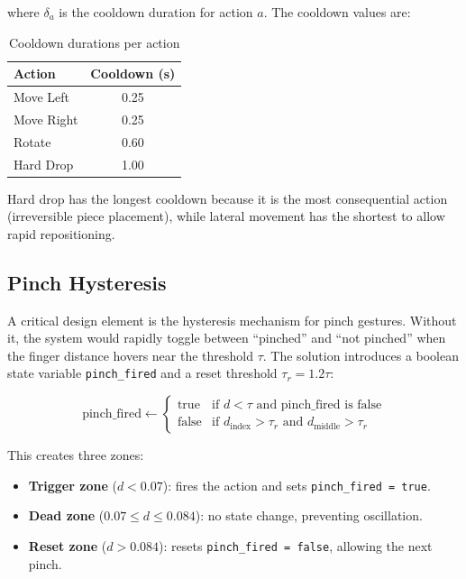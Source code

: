 \documentclass[conference]{IEEEtran}
\begin{document}
where $\delta_a$ is the cooldown duration for action $a$. The cooldown values are:

\begin{table}[H]
\centering
\caption{Cooldown durations per action}
\label{tab:cooldowns}
\begin{tabular}{|l|c|}
\hline
\textbf{Action} & \textbf{Cooldown (s)} \\
\hline
Move Left & 0.25 \\
Move Right & 0.25 \\
Rotate & 0.60 \\
Hard Drop & 1.00 \\
\hline
\end{tabular}
\end{table}

Hard drop has the longest cooldown because it is the most consequential action (irreversible piece placement), while lateral movement has the shortest to allow rapid repositioning.

\subsection{Pinch Hysteresis}

A critical design element is the hysteresis mechanism for pinch gestures. Without it, the system would rapidly toggle between ``pinched'' and ``not pinched'' when the finger distance hovers near the threshold $\tau$. The solution introduces a boolean state variable \texttt{pinch\_fired} and a reset threshold $\tau_r = 1.2\tau$:

\begin{equation}
    \text{pinch\_fired} \leftarrow \begin{cases}
        \text{true} & \text{if } d < \tau \text{ and pinch\_fired is false} \\
        \text{false} & \text{if } d_{\text{index}} > \tau_r \text{ and } d_{\text{middle}} > \tau_r
    \end{cases}
    \label{eq:hysteresis}
\end{equation}

This creates three zones:
\begin{itemize}
    \item \textbf{Trigger zone} ($d < 0.07$): fires the action and sets \texttt{pinch\_fired = true}.
    \item \textbf{Dead zone} ($0.07 \leq d \leq 0.084$): no state change, preventing oscillation.
    \item \textbf{Reset zone} ($d > 0.084$): resets \texttt{pinch\_fired = false}, allowing the next pinch.
\end{itemize}
\end{document}
